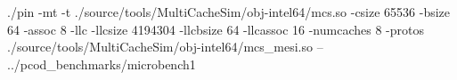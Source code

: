 ./pin -mt -t ./source/tools/MultiCacheSim/obj-intel64/mcs.so -csize 65536 -bsize 64 -assoc 8 -llc -llcsize 4194304 -llcbsize 64 -llcassoc 16 -numcaches 8 -protos ./source/tools/MultiCacheSim/obj-intel64/mcs_mesi.so -- ../pcod_benchmarks/microbench1